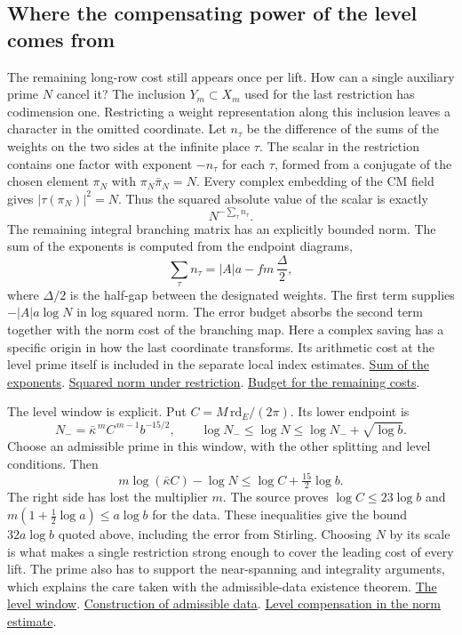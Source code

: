 \documentclass[11pt,letterpaper]{article}
\newcommand{\sref}[2]{\href{https://github.com/VladimirReshetnikov/ProveIt/blob/d8415e76ad850651f8c0083afe689dd9f4a45a10/Analysis/GeneralizedRiemannHypothesis/vendor/grh-lean/grh/src/#1.lean}{#2}}
\begin{document}
\subsection{Where the compensating power of the level comes from}

The remaining long-row cost still appears once per lift. How can a single auxiliary prime \(N\) cancel it? The inclusion \(Y_m\subset X_m\) used for the last restriction has codimension one. Restricting a weight representation along this inclusion leaves a character in the omitted coordinate. Let \(n_\tau\) be the difference of the sums of the weights on the two sides at the infinite place \(\tau\). The scalar in the restriction contains one factor with exponent \(-n_\tau\) for each \(\tau\), formed from a conjugate of the chosen element \(\pi_N\) with \(\pi_N\bar\pi_N=N\). Every complex embedding of the CM field gives \(|\tau(\pi_N)|^2=N\). Thus the squared absolute value of the scalar is exactly
\[
                          N^{-\sum_\tau n_\tau}.
\]
The remaining integral branching matrix has an explicitly bounded norm. The sum of the exponents is computed from the endpoint diagrams,
\[
       \sum_\tau n_\tau=|A|a-fm\,\frac{\Delta}{2},
\]
where \(\Delta/2\) is the half-gap between the designated weights. The first term supplies \(-|A|a\log N\) in log squared norm. The error budget absorbs the second term together with the norm cost of the branching map. Here a complex saving has a specific origin in how the last coordinate transforms. Its arithmetic cost at the level prime itself is included in the separate local index estimates. \sref{New/UpperBound/Objects/Weights}{Sum of the exponents}. \sref{New/UpperBound/Divisibility/ChainValuation}{Squared norm under restriction}. \sref{New/UpperBound/Size/ArchimedeanSize}{Budget for the remaining costs}.

The level window is explicit. Put \(C=M\,\mathrm{rd}_E/(2\pi)\). Its lower endpoint is
\[
             N_- = \bar\kappa^{\,m} C^{\,m-1} b^{-15/2},
  \qquad \log N_-\le\log N\le\log N_-+\sqrt{\log b}.
\]
Choose an admissible prime in this window, with the other splitting and level conditions. Then
\[
        m\log(\bar\kappa C)-\log N
                    \le \log C+\tfrac{15}{2}\log b .
\]
The right side has lost the multiplier \(m\). The source proves \(\log C\le23\log b\) and \(m(1+\tfrac12\log a)\le a\log b\) for the data. These inequalities give the bound \(32a\log b\) quoted above, including the error from Stirling. Choosing \(N\) by its scale is what makes a single restriction strong enough to cover the leading cost of every lift. The prime also has to support the near-spanning and integrality arguments, which explains the care taken with the admissible-data existence theorem. \sref{New/Reduction/Data/AdmissibleData}{The level window}. \sref{New/Reduction/Data/Existence}{Construction of admissible data}. \sref{New/UpperBound/Size/ArchimedeanSize}{Level compensation in the norm estimate}.
\end{document}
